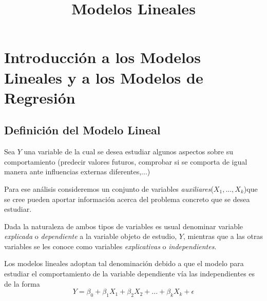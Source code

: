 \documentclass[10pt,a4paper]{book}
\title{Modelos Lineales}
\date{}
\begin{document}
\maketitle
\tableofcontents

\chapter{Introducción a los Modelos Lineales y a los Modelos de Regresión}
	\section{Definición del Modelo Lineal}
Sea $Y$ una variable de la cual se desea estudiar algunos aspectos sobre su comportamiento (predecir valores futuros, comprobar si se comporta de igual manera ante influencias externas diferentes,...)

Para ese análisis consideremos un conjunto de variables \textit{auxiliares}($X_1,...,X_k$)que se cree pueden aportar información acerca del problema concreto que se desea estudiar.

Dada la naturaleza de ambos tipos de variables es usual denominar variable \emph{explicada} o \emph{dependiente} a la variable objeto de estudio, $Y$, mientras que a las otras variables se les conoce como variables \emph{explicativas} o \emph{independientes}.

Los modelos lineales adoptan tal denominación debido a que el modelo para estudiar el comportamiento de la variable dependiente vía las independientes es de la forma $$Y = \beta_0 + \beta_1X_1 + \beta_2X_2 +...+ \beta_kX_k + \epsilon$$
\end{document}
